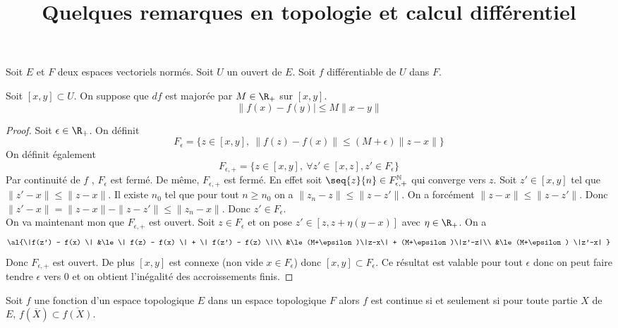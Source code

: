 \documentclass[10pt,a4paper]{article}
\title{Quelques remarques en topologie et calcul différentiel}
\begin{document}
\maketitle
Soit $E$ et $F$ deux espaces vectoriels normés.
Soit $U$ un ouvert de $E$.
Soit $f$ différentiable de $U$ dans $F$.
\begin{thm}
  Soit $[x,y] \subset U$. On suppose que $df$ est majorée par $M\in\R_+$ sur  $[x,y]$.
  \[\|f(x) -f(y)| \le M \|x-y\|\]
\end{thm}
  \begin{proof}

    Soit $\epsilon \in \R_+$. On définit
    \[F_{\epsilon} =  \lbrace z \in [x,y], \ \| f(z) - f(x) \| \le (M+\epsilon)\|z-x\| \rbrace \]
    On définit également \[F_{\epsilon,+} = \lbrace z \in [x,y], \ \forall z' \in [x,z],  z' \in F_{\epsilon} \rbrace\]
    Par continuité de $f$ , $F_{\epsilon}$ est fermé. De même, $F_{\epsilon,+}$ est fermé. En effet soit $\seq{z}{n} \in F_{\epsilon,+}^{\mathbb{N}}$ qui converge vers $z$. Soit $z' \in [x,y]$ tel que $\|z'-x\| \le \|z-x\|$. Il existe $n_0$ tel que pour tout $n \ge n_0$ on a $\|z_n-z\| \le \|z-z'\|$. On a forcément $\|z-x\| \le \|z-z'\|$. Donc $\|z'-x\| = \|z-x\| - \|z-z'\| \le \|z_n -x \|$. Donc $z' \in F_{\epsilon}$.\\
    On va maintenant mon que $F_{\epsilon,+}$ est ouvert. Soit $z \in F_{\epsilon}$ et on pose $z'\in [z,z+\eta(y-x)]$ avec $\eta \in \R_+$. On a
    \[ \al{\|f(z') - f(x) \| &\le \| f(z) - f(x) \| + \| f(z') - f(z) \|\\
        &\le (M+\epsilon)\|z-x\| + (M+\epsilon)\|z'-z|\\
        &\le (M+\epsilon) \|z'-x|
      }\]
    Donc $F_{\epsilon,+}$ est ouvert. De plus $[x,y]$ est connexe (non vide $x \in F_{\epsilon}$) donc $[x,y] \subset F_{\epsilon}$.
    Ce résultat est valable pour tout $\epsilon$ donc on peut faire tendre $\epsilon$ vers $0$ et on obtient l'inégalité des accroissements finis.
  \end{proof}
  \begin{prop}
    Soit $f$ une fonction d'un espace topologique $E$ dans un espace topologique $F$ alors $f$ est continue si et seulement si pour toute partie $X$ de $E$, $f(\overline{X}) \subset \overline{f(X)}$.
  \end{prop}
\end{document}
